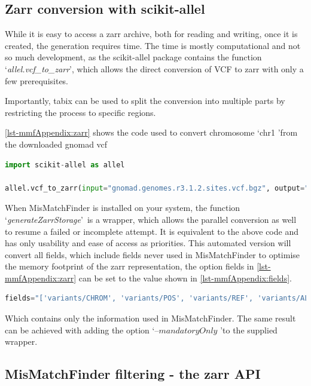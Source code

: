 \subsection{Zarr conversion with scikit-allel}
\label{ch-mmfAppendix:zarr}
While it is easy to access a zarr archive, both for reading and writing, once it is created, the generation requires time. The time is mostly computational and not so much development, as the scikit-allel package contains the function \lq\emph{allel.vcf\_to\_zarr}\rq, which allows the direct conversion of VCF to zarr with only a few prerequisites. 

Importantly, tabix \cite{Li2011} can be used to split the conversion into multiple parts by restricting the process to specific regions.

\autoref{lst-mmfAppendix:zarr} shows the code used to convert chromosome \lq chr1 \rq from the downloaded gnomad vcf

\begin{lstlisting}[language=Python, caption=scikit-allel conversion vcf\_to\_zarr, label={lst-mmfAppendix:zarr}]
import scikit-allel as allel

allel.vcf_to_zarr(input="gnomad.genomes.r3.1.2.sites.vcf.bgz", output="/out/put/folder/",  group="chr1", region="chr1", fields="*")
\end{lstlisting}

When MisMatchFinder is installed on your system, the function \lq\emph{generateZarrStorage}\rq\ is a wrapper, which allows the parallel conversion as well to resume a failed or incomplete attempt. It is equivalent to the above code and has only usability and ease of access as priorities. This automated version will convert all fields, which include fields never used in MisMatchFinder to optimise the memory footprint of the zarr representation, the option fields in \autoref{lst-mmfAppendix:zarr} can be set to the value shown in \autoref{lst-mmfAppendix:fields}.
\begin{lstlisting}[language=Python, caption=field options for reduced memory, label={lst-mmfAppendix:fields}]
fields="['variants/CHROM', 'variants/POS', 'variants/REF', 'variants/ALT', 'variants/AF', 'variants/FILTER_PASS']"
\end{lstlisting}
Which contains only the information used in MisMatchFinder. The same result can be achieved with adding the option \lq --$mandatoryOnly$ \rq to the supplied wrapper.

\subsection{MisMatchFinder filtering - the zarr API}
\label{ch-mmfAppendix:filter}

